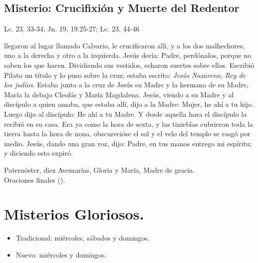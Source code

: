 \documentclass[./main.tex]{subfiles}
\newcounter{sorrowful-counter}
\newcounter{glorious-counter}
\begin{document}
\subsection*{ Misterio: Crucifixión y Muerte del Redentor}
\begin{flushright}
      {\color{red}Lc. 23, 33-34; Jn. 19, 19.25-27; Lc. 23, 44-46}
\end{flushright}
 llegaron al lugar llamado Calvario, le crucificaron allí, y a los dos malhechores, uno a la derecha y otro a la izquierda. Jesús decía: 
Padre, perdónalos, porque no saben los que hacen. Dividiendo sus vestidos, echaron suertes sobre ellos. Escribió Pilato un título y lo puso sobre la cruz; 
estaba escrito: \emph{Jesús Nazareno, Rey de los judíos}. Estaba junto a la cruz de Jesús su Madre y la hermana de su Madre, María la debajo Cleofás y María Magdalena. 
Jesús, viendo a su Madre y al discípulo a quien amaba, que estaba allí, dijo a la Madre: Mujer, he ahí a tu hijo. Luego dijo al discípulo: He ahí a tu Madre. 
Y desde aquella hora el discípulo la recibió en su casa. Era ya como la hora de sexta, y las tinieblas cubrieron toda la tierra hasta la hora de nona, 
obscurecióse el sol y el velo del templo se rasgó por medio. Jesús, dando una gran voz, dijo: Padre, en tus manos entrego mi espíritu; y diciendo esto expiró.

\begin{center}
      Paternóster, diez Avemarías, Gloria y María, Madre de gracia.\\
      Oraciones finales ().
\end{center}

\section*{Misterios Gloriosos.}
\begin{itemize}
      \item Tradicional: miércoles, sábados y domingos.
      \item Nuevo: miércoles y domingos.
\end{itemize}

\end{document}
